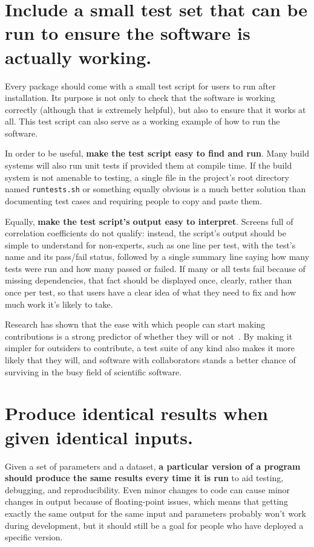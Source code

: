 \documentclass[10pt,letterpaper]{article}
\begin{document}
\section{Include a small test set that can be run to ensure the software is actually working.}

Every package should come with a small test script for users to run
after installation. Its purpose is not only to check that the software
is working correctly (although that is extremely helpful), but also to
ensure that it works at all. This test script can also serve as a
working example of how to run the software.

In order to be useful, \textbf{make the test script easy to find and run}. 
Many build systems will also run unit tests if provided them at compile time.
If the build system is not amenable to testing, a 
single file in the project's root directory named \texttt{runtests.sh}
or something equally obvious is a much better solution than documenting
test cases and requiring people to copy and paste them.

Equally, \textbf{make the test script's output easy to interpret}. Screens
full of correlation coefficients do not qualify: instead, the script's
output should be simple to understand for non-experts,
such as one line per test, with the test's name
and its pass/fail status, followed by a single summary line saying how
many tests were run and how many passed or failed. If many or all tests
fail because of missing dependencies, that fact should be displayed
once, clearly, rather than once per test, so that users have a clear
idea of what they need to fix and how much work it's likely to take.

Research has shown that the ease with which people can start making
contributions is a strong predictor of whether they will or not~\cite{steinmacher2015}.
By making it simpler for outsiders to contribute,
a test suite of any kind also makes it more likely that they will, and software
with collaborators stands a better chance of surviving in the busy field of
scientific software.

\section{Produce identical results when given identical inputs.}

Given a set of parameters and a dataset, \textbf{a particular version of a program
should produce the same results every time it is run}
to aid testing, debugging, and reproducibility.
Even minor changes to code can cause minor changes in output because of floating-point issues,
which means that getting exactly the same output for the same input and parameters
probably won't work during development,
but it should still be a goal for people who have deployed a specific version.
\end{document}
